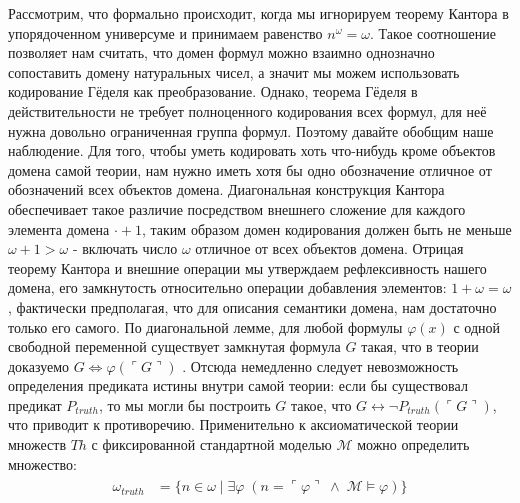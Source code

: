 \documentclass[12pt]{article}
\begin{document}
Рассмотрим, что формально происходит, когда мы игнорируем теорему Кантора в упорядоченном универсуме и принимаем равенство $n^{\omega} = \omega$. Такое соотношение позволяет нам считать, что домен формул можно взаимно однозначно сопоставить домену натуральных чисел, а значит мы можем использовать кодирование Гёделя как преобразование. Однако, теорема Гёделя в действительности не требует полноценного кодирования всех формул, для неё нужна довольно ограниченная группа формул. Поэтому давайте обобщим наше наблюдение. Для того, чтобы уметь кодировать хоть что-нибудь кроме объектов домена самой теории, нам нужно иметь хотя бы одно обозначение отличное от обозначений всех объектов домена. Диагональная конструкция Кантора обеспечивает такое различие посредством внешнего сложение для каждого элемента домена $\cdot + 1$, таким образом домен кодирования должен быть не меньше $\omega + 1 > \omega$ - включать число $\omega$ отличное от всех объектов домена. Отрицая теорему Кантора и внешние операции мы утверждаем рефлексивность нашего домена, его замкнутость относительно операции добавления элементов: $1 + \omega = \omega$, фактически предполагая, что для описания семантики домена, нам достаточно только его самого. По диагональной лемме, для любой формулы $\varphi(x)$ с одной свободной переменной существует замкнутая формула $G$ такая, что в теории доказуемо $G \Leftrightarrow \varphi(\ulcorner G \urcorner)$ \cite{diagonal-lemma}. Отсюда немедленно следует невозможность определения предиката истины внутри самой теории: если бы существовал предикат $P_{truth}$, то мы могли бы построить $G$ такое, что $G \leftrightarrow \neg P_{truth}(\ulcorner G \urcorner)$, что приводит к противоречию. Применительно к аксиоматической теории множеств $Th$ с фиксированной стандартной моделью $\mathcal{M}$ можно определить множество:
\begin{align}
\begin{split}
\omega_{truth} &= \{ n \in \omega \mid \exists \varphi \; (n = \ulcorner \varphi \urcorner \; \wedge \; \mathcal{M} \models \varphi) \}
\end{split}
\end{align}
\end{document}
